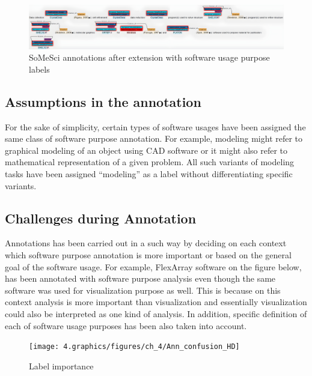\begin{figure}[htbp]
	\centering
	\includegraphics[width=.99\textwidth]{4.graphics/figures/ch_4/after_ann_hd}
	\caption{\ac{SoMeSci} annotations after extension with software usage purpose labels}
	\label{fig:chapter04:setup}
\end{figure}


\subsection{Assumptions in the annotation}
\label{subsec:dataset:tool:Assumptions}

For the sake of simplicity, certain types of software usages have been assigned the same class of software purpose annotation. For example, modeling might refer to graphical modeling of an object using \ac{CAD} software or it might also refer to mathematical representation of a given problem.  All such variants of modeling tasks have been assigned “modeling” as a label without differentiating specific variants. 



\subsection{Challenges during Annotation }
\label{subsec:dataset:tool:Challenges}
Annotations has been carried out in a such way by deciding on each context which software purpose annotation is more important or based on the general goal of the software usage. For example, FlexArray software on the figure below, has been annotated with software purpose analysis even though the same software was used for visualization purpose as well. This is because on this context analysis is more important than visualization and essentially visualization could also be interpreted as one kind of analysis. In addition, specific definition of each of software usage purposes has been also taken into account. \\

\begin{figure}[htbp]
	\centering
	\texttt{[image: 4.graphics/figures/ch\_4/Ann\_confusion\_HD]}
	\caption{Label importance}
	\label{fig:chapter04:setup}
\end{figure}

